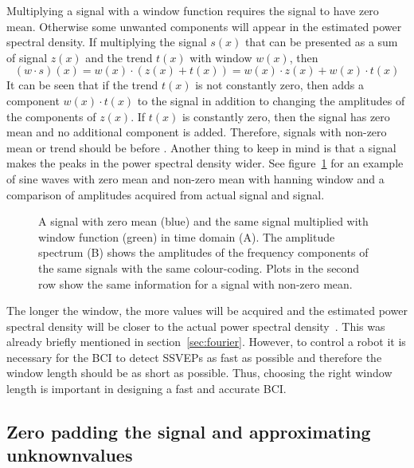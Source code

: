 Multiplying a signal with a \gls{window} function requires the signal to have zero mean. Otherwise some unwanted components will appear in the estimated \gls{power spectral density}. If multiplying the signal $s(x)$ that can be presented as a sum of  signal $z(x)$ and the trend $t(x)$ with \gls{window} $w(x)$, then
\begin{equation}
	(w\cdot s)(x) = w(x)\cdot(z(x)+t(x))=w(x)\cdot z(x)+w(x)\cdot t(x)
\end{equation}
It can be seen that if the \gls{trend} $t(x)$ is not constantly zero, then  adds a component $w(x)\cdot t(x)$ to the signal in addition to changing the amplitudes of the components of $z(x)$. If $t(x)$ is constantly zero, then the signal has zero \gls{mean} and no additional component is added. Therefore, signals with non-zero \gls{mean} or \gls{trend} should be  before . Another thing to keep in mind is that  a signal makes the peaks in the \gls{power spectral density} wider. See figure~\ref{fig:window} for an example of sine waves with zero \gls{mean} and non-zero \gls{mean}  with hanning \gls{window} and a comparison of amplitudes acquired from actual signal and  signal.

\begin{figure}[h!]
	
	\caption{A signal with zero mean (blue) and the same signal multiplied with window function (green) in time domain (A). The amplitude spectrum (B) shows the amplitudes of the frequency components of the same signals with the same colour-coding. Plots in the second row show the same information for a signal with non-zero mean.}
	\label{fig:window}
\end{figure}

The longer the window, the more values will be acquired and the estimated \gls{power spectral density} will be closer to the actual \gls{power spectral density}~\cite{psd}. This was already briefly mentioned in section~\ref{sec:fourier}. However, to control a robot it is necessary for the \gls{BCI} to detect \glspl{SSVEP} as fast as possible and therefore the \gls{window} length should be as short as possible. Thus, choosing the right \gls{window} length is important in designing a fast and accurate \gls{BCI}.

\subsection[Zero padding the signal and approximating unknown values]{Zero padding the signal and approximating unknown\break values}
\label{sec:interpolate}

